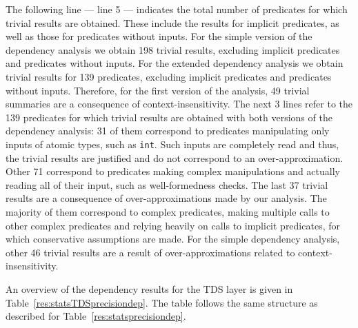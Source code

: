 \documentclass[11pt]{article}
\begin{document}
The following line --- line 5 --- indicates the total number of predicates for
which trivial results are obtained. These include the results for implicit
predicates, as well as those for predicates without inputs. For the simple
version of the dependency analysis we obtain 198 trivial results, excluding
implicit predicates and predicates without inputs. For the extended
dependency analysis we obtain trivial results for 139 predicates, excluding
implicit predicates and predicates without inputs. Therefore, for the first
version of the analysis, 49 trivial summaries are a consequence of
context-insensitivity. The next 3 lines refer to the 139 predicates for which
trivial results are obtained with both versions of the dependency analysis:
31 of them correspond to predicates manipulating only inputs of atomic types,
such as \texttt{int}. Such inputs are completely read and thus, the trivial
results are justified and do not correspond to an over-approximation.  Other
71 correspond to predicates making complex manipulations and actually reading
all of their input, such as well-formedness checks. The last 37 trivial
results are a consequence of over-approximations made by our analysis. The
majority of them correspond to complex predicates, making multiple calls to
other complex predicates and relying heavily on calls to implicit predicates,
for which conservative assumptions are made. For the simple dependency analysis,
other 46 trivial results are a result of over-approximations related to 
context-insensitivity.
   
An overview of the dependency results for the TDS layer is given in 
Table~\ref{res:statsTDSprecisiondep}. The table follows the same structure as
described for Table~\ref{res:statsprecisiondep}.
\end{document}
